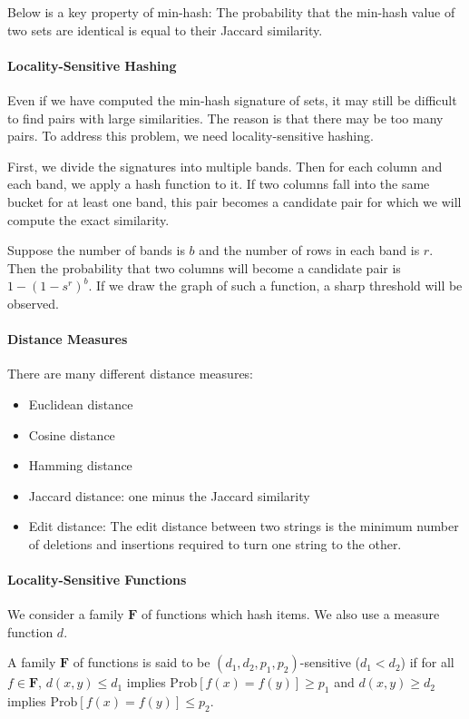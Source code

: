 \documentclass{article}
\begin{document}
Below is a key property of min-hash: The probability that the min-hash value of two sets are identical is equal to their Jaccard similarity.

\paragraph{Locality-Sensitive Hashing}
Even if we have computed the min-hash signature of sets, it may still be difficult to find pairs with large similarities. The reason is that there may be too many pairs. To address this problem, we need locality-sensitive hashing.

First, we divide the signatures into multiple bands. Then for each column and each band, we apply a hash function to it. If two columns fall into the same bucket for at least one band, this pair becomes a candidate pair for which we will compute the exact similarity. 

Suppose the number of bands is $b$ and the number of rows in each band is $r$. Then the probability that two columns will become a candidate pair is $1-(1-s^r)^b$. If we draw the graph of such a function, a sharp threshold will be observed. 

\paragraph{Distance Measures} There are many different distance measures:
\begin{itemize}
\item Euclidean distance
\item Cosine distance
\item Hamming distance
\item Jaccard distance: one minus the Jaccard similarity
\item Edit distance: The edit distance between two strings is the minimum number of deletions and insertions required to turn one string to the other.
\end{itemize}

\paragraph{Locality-Sensitive Functions} We consider a family $\mathbf{F}$ of functions which hash items. We also use a measure function $d$.

A family $\mathbf{F}$ of functions is said to be $(d_1,d_2,p_1,p_2)$-sensitive ($d_1<d_2$) if for all $f\in\mathbf{F}$, $d(x,y)\le d_1$ implies $\mathrm{Prob}[f(x)=f(y)]\ge p_1$ and $d(x,y)\ge d_2$ implies $\mathrm{Prob}[f(x)=f(y)]\le p_2$.
\end{document}

